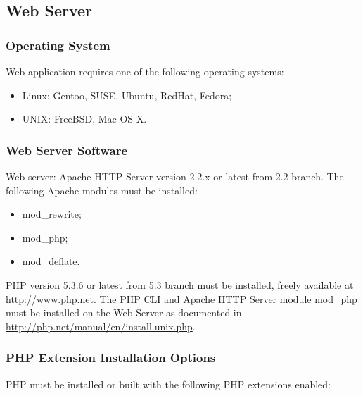 \documentclass[12pt]{article}
\newcommand{\vigShowNotes}{1}
\newcommand{\note}[1]{\ifthenelse{\vigShowNotes=1}{
\textbf{NOTE:} 
\textcolor{Brown}{
#1
}
}{}}
\begin{document}
\subsection{Web Server}

\subsubsection{Operating System}
Web application requires one of the following operating systems:
\begin{itemize}
	\item Linux: Gentoo, SUSE, Ubuntu, RedHat, Fedora;
	\item UNIX: FreeBSD, Mac OS X.
\end{itemize}

\subsubsection{Web Server Software}
Web server: Apache HTTP Server version 2.2.x or latest from 2.2 branch. The following Apache modules must be installed:
\begin{itemize}
	\item mod\_rewrite;
	\item mod\_php;
	\item mod\_deflate.
\end{itemize}

PHP version 5.3.6 or latest from 5.3 branch must be installed, freely available at \url{http://www.php.net}. The PHP CLI and Apache HTTP Server module \textsf{mod\_php} must be installed on the Web Server as documented in \url{http://php.net/manual/en/install.unix.php}.

\note{PHP 5.3.3 required because "As of PHP 5.3.3, methods with the same name as the last element of a namespaced class name will no longer be treated as constructor. This change doesn't affect non-namespaced classes.". Some Supra classes might have methods with name equal to classname without intention to work as constructor.}
	
	\note{5.3.6 required for correct Mysql charset support on connection options without "SET NAMES" request.}

\subsubsection{PHP Extension Installation Options}

PHP must be installed or built with the following PHP extensions enabled:
\end{document}
